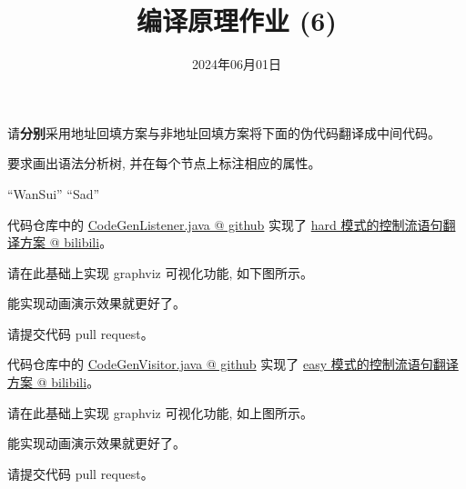 \documentclass[a4paper, justified]{tufte-handout}
\title{编译原理作业 (6)}
\date{2024年06月01日}
\begin{document}
\maketitle
\noplagiarism %
\begin{abstract}
\end{abstract}
\beginrequired

\begin{problem}
  请{\bf 分别}采用地址回填方案与非地址回填方案将下面的伪代码翻译成中间代码。

  \noindent 要求画出语法分析树, 并在每个节点上标注相应的属性。
  \begin{algorithm}[H]
    \begin{algorithmic}[1]
            \State {} ``WanSui''
          \EndWhile
        \Else
          \State {} ``Sad''
        \EndIf
      \EndProcedure
    \end{algorithmic}
  \end{algorithm}
\end{problem}

\begin{solution}
\end{solution}

\beginoptional
\begin{problem}
  代码仓库中的
  \href{https://github.com/courses-at-nju-by-hfwei/2024-compilers-coding/blob/main/src/main/java/codegen/hardcontrol/CodeGenListener.java}{CodeGenListener.java @ github}
  实现了 \href{https://www.bilibili.com/video/BV1rx4y1W7DT/?spm_id_from=333.788&vd_source=e3cbbf5ca80db268fa006d63626e267e}{hard 模式的控制流语句翻译方案 @ bilibili}。

  \noindent 请在此基础上实现 graphviz 可视化功能, 如下图所示。

  \noindent 能实现动画演示效果就更好了。

  \noindent 请提交代码 pull request。
\end{problem}

\begin{solution}

\end{solution}

\begin{problem}
  代码仓库中的
  \href{https://github.com/courses-at-nju-by-hfwei/2024-compilers-coding/blob/main/src/main/java/codegen/easycontrol/CodeGenVisitor.java}{CodeGenVisitor.java @ github}
  实现了 \href{https://www.bilibili.com/video/BV1oD421w7Je/?spm_id_from=333.788&vd_source=e3cbbf5ca80db268fa006d63626e267e}{easy 模式的控制流语句翻译方案 @ bilibili}。

  \noindent 请在此基础上实现 graphviz 可视化功能, 如上图所示。

  \noindent 能实现动画演示效果就更好了。

  \noindent 请提交代码 pull request。
\end{problem}
\end{document}
